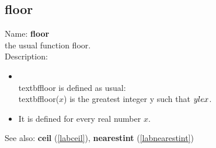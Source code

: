 \subsection{floor}
\label{labfloor}
\noindent Name: \textbf{floor}\\
the usual function floor.\\
\noindent Description: \begin{itemize}

\item \\textbf{floor} is defined as usual: \\textbf{floor}($x$) is the greatest integer y such that $y \\le x$.\n
\item It is defined for every real number $x$.\n\end{itemize}
See also: \textbf{ceil} (\ref{labceil}), \textbf{nearestint} (\ref{labnearestint})
